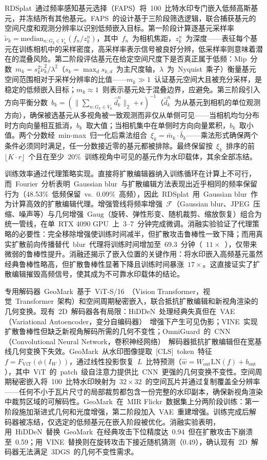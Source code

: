 RDSplat~通过频率感知基元选择（FAPS）将~100~比特水印专门嵌入低频高斯基元，并冻结所有其他基元。FAPS~的设计基于三阶段筛选逻辑，联合捕获基元的空间尺度和观测分辨率以识别低频嵌入目标。第一阶段计算逐基元采样率~$\tilde{\nu}_k = \mathrm{median}_{n: G_k \in V_n}(f_n / z_k^n)$，其中~$f_n$~为相机焦距，$z_k^n$~为深度——表征每个基元在训练相机中的采样密度，高采样率表示信号被良好分辨，低采样率则意味着潜在的混叠风险。第二阶段评估基元在给定空间尺度下是否真正属于低频：Mip~分数~$m_k = s_k^2 \tilde{\nu}_k^2 / \lambda^2$（$s_k = \max_d s_{k,d}$~为主尺度轴，$\lambda$~为~Nyquist~乘子）衡量基元空间范围相对于采样分辨率的比值——$m_k \gg 1$~认证基元空间大且被充分采样，是稳定的低频嵌入目标；$m_k \approx 1$~则表示基元处于混叠边界，应避免。第三阶段引入方向平衡分数~$b_k = (\|\sum_{n: G_k \in V_n} \hat{d}_k^n\|_2 + \epsilon)^{-1}$（$\hat{d}_k^n$~为从基元到相机的单位观测方向），确保被选基元从多视角被一致观测而非仅从单侧可见——当相机均匀分布时方向向量相互抵消，$b_k$~取大值；当相机集中在单侧时方向向量累积，$b_k$~取小值。两个分数经~min-max~归一化后乘法组合~$\xi_k = \bar{m}_k \cdot \bar{b}_k$——乘法形式确保两个条件必须同时满足，任一分数接近零的基元都被排除。最终保留按~$\xi_k$~排序的前~$\lfloor K \cdot r \rfloor$~个且在至少~20\%~训练视角中可见的基元作为水印载体，其余全部冻结。

训练效率通过代理策略实现。直接将扩散编辑器纳入训练循环在计算上不可行，而~Fourier~分析表明~Gaussian blur~与扩散编辑方法表现出近乎相同的频率保留行为（48.53\%~低频保留~vs.~0.09\%~高频），因此~RDSplat~用~Gaussian blur~作为计算高效的扩散编辑代理。增强管线将频率增强~$\mathcal{F}$（Gaussian blur、JPEG~压缩、噪声等）与几何增强~$\mathrm{Gaug}$（旋转、弹性形变、随机裁剪、缩放恢复）组合为统一管线，在单~RTX 4090 GPU~上~3--7~分钟完成微调。消融实验验证了代理策略的必要性：完全移除增强使训练时间减半，但扩散攻击鲁棒性一致下降；而用真实扩散前向传播替代~blur~代理将训练时间增加至~69.3~分钟（~$11\times$~），仅带来微弱的鲁棒性提升。消融还揭示了嵌入位置的关键作用：将水印嵌入高频基元虽然经典鲁棒性略高，但扩散鲁棒性显著下降且训练时间暴涨~$17\times$。这直接证实了扩散编辑摧毁高频信号，使其成为不可靠水印载体的结论。

专用解码器~GeoMark~基于~ViT-S/16~（Vision Transformer，视觉~Transformer~架构）和空间周期秘密嵌入，联合抵抗扩散编辑和新视角渲染的几何变换。现有~2D~解码器各有局限：HiDDeN~处理经典失真但在~VAE（Variational Autoencoder，变分自编码器）~增强下产生可见伪影；VINE~实现扩散鲁棒性但缺乏新视角解码所需的几何不变性；OmniGuard~的~CNN（Convolutional Neural Network，卷积神经网络）~解码器抵抗扩散编辑但在宽基线几何变换下失效。GeoMark~从水印图像提取~[CLS]~token~特征~$f = F_{\mathrm{ViT}}(\phi(I_W))$，通过线性投影恢复~$L$~比特预测（$\hat{w} = W_{\mathrm{out}} \mathrm{LN}(f) + b_{\mathrm{out}}$），其中~ViT~的~patch~级自注意力提供比~CNN~更强的几何变换不变性。空间周期秘密嵌入将~100~比特水印映射为~$32 \times 32$~的空间瓦片并通过复制覆盖全分辨率——任何不小于瓦片尺寸的局部裁剪都包含一份完整的水印副本，确保新视角渲染中裁剪区域的可解码性。GeoMark~在~MIR Flickr~数据集上分两阶段训练：第一阶段施加渐进式几何和光度增强，第二阶段加入~VAE~重建增强。训练完成后解码器被冻结，仅选定的低频基元在嵌入阶段被优化。消融实验表明，用~HiDDeN~替换~GeoMark~在经典攻击下位精度达~0.94~但在扩散攻击下崩溃至~0.59；用~VINE~替换则在旋转攻击下接近随机猜测（0.49），确认现有~2D~解码器无法满足~3DGS~的几何不变性需求。

